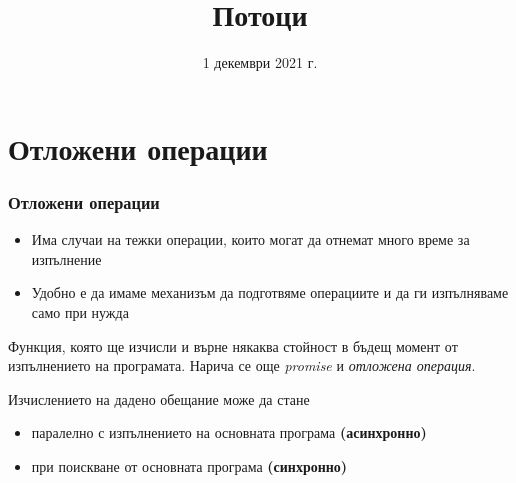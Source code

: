 \documentclass[alsotrans]{beamerswitch}
\title{Потоци}
\date{1 декември 2021 г.}
\begin{document}
\begin{frame}
  \titlepage
\end{frame}

\section{Отложени операции}

\begin{frame}
  \frametitle{Отложени операции}

  \begin{itemize}[<+->]
  \item Има случаи на тежки операции, които могат да отнемат много време за изпълнение
  \item Удобно е да имаме механизъм да \alert{подготвяме} операциите и да ги \alert{изпълняваме} само при нужда
  \end{itemize}
  \onslide<+->
  \begin{definition}[Обещание]
    Функция, която ще изчисли и върне някаква стойност в бъдещ момент от изпълнението на програмата.
    \onslide<+->
    Нарича се още \emph{promise} и \emph{отложена операция}.
  \end{definition}
  \onslide<+->
  Изчислението на дадено обещание може да стане
  \begin{itemize}[<+->]
  \item паралелно с изпълнението на основната програма \textbf{(асинхронно)}
  \item при поискване от основната програма \textbf{(синхронно)}
  \end{itemize}
\end{frame}
\end{document}
